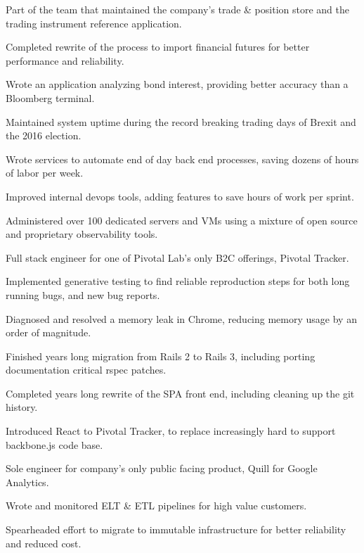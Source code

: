 \documentclass[]{deedy-resume-openfont}
\begin{document}
\vspace{\topsep}
\begin{tightemize}
\item Part of the team that maintained the company's trade \& position store and the trading instrument reference application.
\item Completed rewrite of the process to import financial futures for better performance and reliability.
\item Wrote an application analyzing bond interest, providing better accuracy than a Bloomberg terminal.
\item Maintained system uptime during the record breaking trading days of Brexit and the 2016 election.
\item Wrote services to automate end of day back end processes, saving dozens of hours of labor per week.
\item Improved internal devops tools, adding features to save hours of work per sprint.
\item Administered over 100 dedicated servers and VMs using a mixture of open source and proprietary observability tools.
\end{tightemize}
\sectionsep

\vspace{\topsep}
Full stack engineer for one of Pivotal Lab's only B2C offerings, Pivotal Tracker.
\vspace{\topsep}
\begin{tightemize}
\item Implemented generative testing to find reliable reproduction steps for both long running bugs, and new bug reports.
\item Diagnosed and resolved a memory leak in Chrome, reducing memory usage by an order of magnitude.
\item Finished years long migration from Rails 2 to Rails 3, including porting documentation critical rspec patches.
\item Completed years long rewrite of the SPA front end, including cleaning up the git history.
\item Introduced React to Pivotal Tracker, to replace increasingly hard to support backbone.js code base.
\end{tightemize}

\sectionsep
{}
\vspace{\topsep}
\begin{tightemize}
\item Sole engineer for company's only public facing product, Quill for Google Analytics.
\item Wrote and monitored ELT \& ETL pipelines for high value customers.
\item Spearheaded effort to migrate to immutable infrastructure for better reliability and reduced cost.
\end{tightemize}
\end{document}
